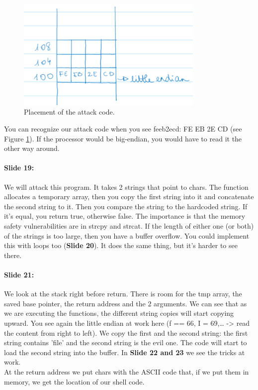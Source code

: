 \documentclass[10pt,a4paper]{report}
\begin{document}
\begin{figure}[ht!]
\centering
\includegraphics[width=90mm]{Les2_03.png}
\caption{Placement of the attack code.} 
\label{les2_03}
\end{figure}

You can recognize our attack code when you see feeb2ecd: FE EB 2E CD (see Figure \ref{les2_03}). If the processor would be big-endian, you would have to read it the other way around.

\paragraph{Slide 19:} We will attack this program. It takes 2 strings that point to chars. The function allocates a temporary array, then you copy the first string into it and concatenate the second string to it. Then you compare the string to the hardcoded string. If it's equal, you return true, otherwise false. The importance is that the memory safety vulnerabilities are in strcpy and strcat. If the length of either one (or both) of the strings is too large, then you have a buffer overflow. You could implement this with loops too (\textbf{Slide 20}). It does the same thing, but it's harder to see there. 

\paragraph{Slide 21:} We look at the stack right before return. There is room for the tmp array, the saved base pointer, the return address and the 2 arguments. We can see that as we are executing the functions, the different string copies will start copying upward. You see again the little endian at work here (f == 66, I = 69,… -> read the content from right to left). 
We copy the first and the second string: the first string contains 'file' and the second string is the evil one. The code will start to load the second string into the buffer. In \textbf{Slide 22 and 23} we see the tricks at work. \\
At the return address we put chars with the ASCII code that, if we put them in memory, we get the location of our shell code. 
\end{document}
